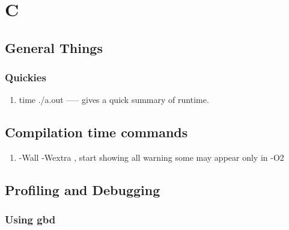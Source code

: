 \chapter{C}
\section{General Things}
\subsection{Quickies}
\begin{enumerate}
    \item time ./a.out ----- gives a quick summary of runtime.
\end{enumerate}



\section{Compilation time commands}
\begin{enumerate}
    \item -Wall -Wextra , start showing all warning some may appear only in -O2
\end{enumerate}




\section{Profiling and Debugging}
\subsection{Using gbd}

